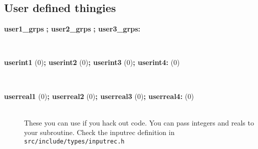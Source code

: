 \subsection{User defined thingies}
\begin{description}
\item[{\bf user1\_grps }{\bf  ; user2\_grps }{\bf  ; user3\_grps: }]\mbox{}\\
\item[{\bf userint1 }(0){\bf  ; userint2 }(0){\bf  ; userint3 }(0){\bf  ; userint4: }(0)]\mbox{}\\
\item[{\bf userreal1 }(0){\bf  ; userreal2 }(0){\bf  ; userreal3 }(0){\bf  ; userreal4: }(0)]\mbox{}\\
These you can use if you hack out code. You can pass integers and
reals to your subroutine. Check the inputrec definition in
{\tt src/include/types/inputrec.h}
\end{description}

